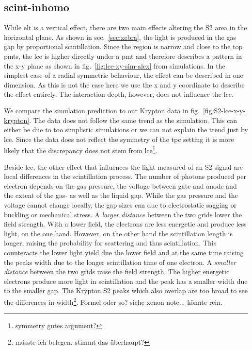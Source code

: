 
\FloatBarrier
\subsection{scint-inhomo}
\label{ssec:scint-inhomo}
\FloatBarrier


While \gls{elt} is a vertical effect, there are two main effects altering the S2 area in the horizontal plane.
As shown in sec.~\ref{sec:xebra}, the light is produced in the gas gap by proportional scintillation.
Since the region is narrow and close to the top \gls{pmt}s, the \gls{lce} is higher directly under a \gls{pmt} and therefore describes a pattern in the x-y plane as shown in fig.~\ref{fig:lce-xy-sim-alex} from simulations.
In the simplest case of a radial symmetric behaviour, the effect can be described in one dimension.
As this is not the case here we use the x and y coordinate to describe the effect entirely.
The interaction depth, however, does not influence the \gls{lce}.

We compare the simulation prediction to our Krypton data in fig.~\ref{fig:S2-lce-x-y-krypton}.  %
The data does not follow the same trend as the simulation.
This can either be due to too simplistic simulations or we can not explain the trend just by \gls{lce}.
Since the data does not reflect the symmetry of the \gls{tpc} setting it is more likely that the discrepancy does not stem from \gls{lce}\footnote{symmetry gutes argument?}.

Beside \gls{lce}, the other effect that influences the light measured of an S2 signal are local differences in the scintillation process.
The number of photons produced per electron depends on the gas pressure, the voltage between gate and anode and the extent of the gas- as well as the liquid gap.
While the gas pressure and the voltage cannot change locally, the gap sizes can due to electrostatic sagging or buckling or mechanical stress.
A \emph{larger distance} between the two grids lower the field strength.
With a lower field, the electrons are less energetic and produce less light, on the one hand.
However, on the other hand the scintillation length is longer, raising the probability for scattering and thus scintillation.
This counteracts the lower light yield due the lower field and at the same time raising the peaks width due to the longer scintillation time of one electron.
A \emph{smaller distance} between the two grids raise the field strength.
The higher energetic electrons produce more light in scintillation and the peak has a smaller width due to the smaller gap.
The Krypton S2 peaks which also overlap are too broad to see the differences in width\footnote{müsste ich belegen. stimmt das überhaupt?}.
Formel oder so? siehe xenon note... könnte rein.


